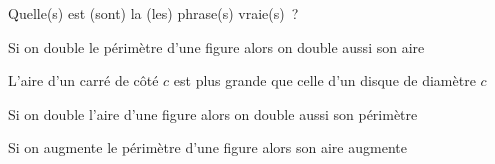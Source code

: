 \begin{QCM}
\begin{GroupeQCM}
    
    \begin{exercice}
      Quelle(s) est (sont) la (les) phrase(s) vraie(s) ?
      \begin{ChoixQCM}{4}
      \item Si on double le périmètre d'une figure alors on double aussi son aire
      \item L'aire d'un carré de côté $c$ est plus grande que celle d'un disque de diamètre $c$
      \item Si on double l'aire d'une figure alors on double aussi son périmètre
      \item Si on augmente le périmètre d'une figure alors son aire augmente
      \end{ChoixQCM}
\begin{corrige}
   \end{corrige}
    \end{exercice}

\end{GroupeQCM}
\end{QCM}

  